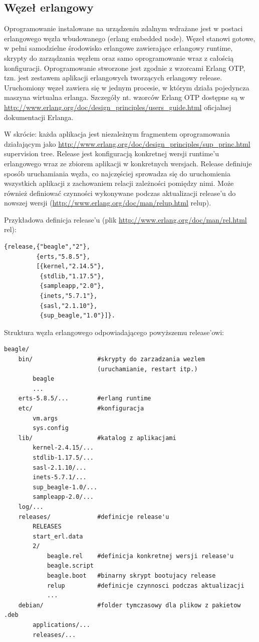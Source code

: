 \documentclass[polish,12pt]{aghthesis}
\begin{document}
\subsection{Węzeł erlangowy}
Oprogramowanie instalowane na urządzeniu zdalnym wdrażane jest w postaci erlangowego węzła wbudowanego (erlang embedded node). Węzeł stanowi gotowe, w pełni samodzielne środowisko erlangowe zawierające erlangowy runtime, skrypty do zarządzania węzłem oraz samo oprogramowanie wraz z całością konfiguracji. Oprogramowanie stworzone jest zgodnie z wzorcami Erlang OTP, tzn. jest zestawem aplikacji erlangowych tworzących erlangowy release. Uruchomiony węzeł zawiera się w jednym procesie, w którym działa pojedyncza maszyna wirtualna erlanga. Szczegóły nt. wzorców Erlang OTP dostępne są w  \url{http://www.erlang.org/doc/design_principles/users_guide.html} oficjalnej dokumentacji Erlanga.

W skrócie: każda aplikacja jest niezależnym fragmentem oprogramowania działającym jako \url{http://www.erlang.org/doc/design_principles/sup_princ.html} supervision tree. Release jest konfiguracją konkretnej wersji runtime'u erlangowego wraz ze zbiorem aplikacji w konkretnych wersjach. Release definiuje sposób uruchamiania węzła, co najczęściej sprowadza się do uruchomienia wszystkich aplikacji z zachowaniem relacji zależności pomiędzy nimi. Może również definiować czynności wykonywane podczas aktualizacji release'u do nowszej wersji (\url{http://www.erlang.org/doc/man/relup.html} relup).

Przykładowa definicja release'u (plik \url{http://www.erlang.org/doc/man/rel.html} rel):

\begin{lstlisting}
{release,{"beagle","2"},
         {erts,"5.8.5"},
         [{kernel,"2.14.5"},
          {stdlib,"1.17.5"},
          {sampleapp,"2.0"},
          {inets,"5.7.1"},
          {sasl,"2.1.10"},
          {sup_beagle,"1.0"}]}.
\end{lstlisting}

Struktura węzła erlangowego odpowiadającego powyższemu release'owi:

\begin{lstlisting}
beagle/
    bin/                  #skrypty do zarzadzania wezlem
                          (uruchamianie, restart itp.)
        beagle
        ...
    erts-5.8.5/...        #erlang runtime
    etc/                  #konfiguracja
        vm.args
        sys.config
    lib/                  #katalog z aplikacjami
        kernel-2.4.15/...
        stdlib-1.17.5/...
        sasl-2.1.10/...
        inets-5.7.1/...
        sup_beagle-1.0/...
        sampleapp-2.0/...
    log/...
    releases/             #definicje release'u
        RELEASES
        start_erl.data
        2/
            beagle.rel    #definicja konkretnej wersji release'u
            beagle.script
            beagle.boot   #binarny skrypt bootujacy release
            relup         #definicje czynnosci podczas aktualizacji
            ...
    debian/               #folder tymczasowy dla plikow z pakietow .deb
        applications/...
        releases/...
\end{lstlisting}
\end{document}
